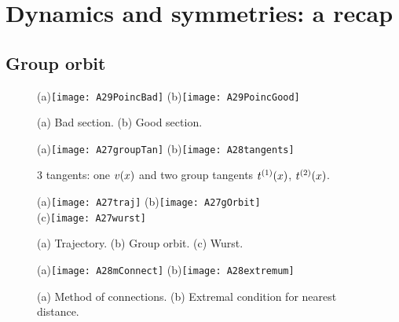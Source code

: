 
\section{Dynamics and symmetries: a recap}
\label{s:cut}

\subsection{Group orbit}


    \ifdraft\color{blue}
\begin{figure}
   \centering
(a)\texttt{[image: A29PoincBad]}
(b)\texttt{[image: A29PoincGood]}
   \caption{\label{fig:A29PoincBad}
    (a)
Bad section.
    (b)
Good section.
}
\end{figure}

\begin{figure}
   \centering
(a)\texttt{[image: A27groupTan]}
(b)\texttt{[image: A28tangents]}
   \caption{\label{fig:tangents}
3 tangents: one $v(x)$  and two group tangents
$t^{(1)}(x)$, $t^{(2)}(x)$.
}
\end{figure}

\begin{figure}
   \centering
(a)\texttt{[image: A27traj]}
(b)\texttt{[image: A27gOrbit]}
    \\
(c)\texttt{[image: A27wurst]}
   \caption{\label{fig:A27wurst}
    (a)
Trajectory.
    (b)
Group orbit.
    (c)
Wurst.
}
\end{figure}

\begin{figure}
   \centering
(a)\texttt{[image: A28mConnect]}
(b)\texttt{[image: A28extremum]}
   \caption{\label{fig:A28extremum}
    (a)
Method of connections.
    (b)
Extremal condition for nearest distance.
}
\end{figure}



